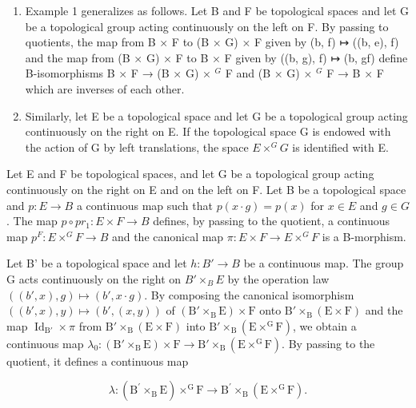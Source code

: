 \begin{enumerate}
\def\labelenumi{\arabic{enumi})}
\setcounter{enumi}{1}
\item
  Example 1 generalizes as follows. Let B and F be topological spaces and let G be a topological group acting continuously on the left on F. By passing to quotients, the map from B × F to (B × G) × F given by (b, f) ↦ ((b, e), f) and the map from (B × G) × F to B × F given by ((b, g), f) ↦ (b, gf) define B-isomorphisms B × F → (B × G) × \(^{G}\) F and (B × G) × \(^{G}\) F → B × F which are inverses of each other.
\item
  Similarly, let E be a topological space and let G be a topological group acting continuously on the right on E. If the topological space G is endowed with the action of G by left translations, the space \(E \times^{G} G\) is identified with E.
\end{enumerate}

Let E and F be topological spaces, and let G be a topological group acting continuously on the right on E and on the left on F. Let B be a topological space and \(p\colon E \to B\) a continuous map such that \(p(x \cdot g) = p(x)\) for \(x \in E\) and \(g \in G\) . The map \(p \circ pr_{1}\colon E \times F \to B\) defines, by passing to the quotient, a continuous map \(p^{F}\colon E \times^{G} F \to B\) and the canonical map \(\pi\colon E \times F \to E \times^{G} F\) is a B-morphism.

Let B' be a topological space and let \(h\colon B'\to B\) be a continuous map. The group G acts continuously on the right on \(B'\times_{B}E\) by the operation law \(((b',x),g)\mapsto(b',x\cdot g)\). By composing the canonical isomorphism \(((b',x),y)\mapsto(b',(x,y))\) of \((\mathrm{B}'\times_{\mathrm{B}}\mathrm{E})\times\mathrm{F}\) onto \(\mathrm{B}'\times_{\mathrm{B}}(\mathrm{E}\times\mathrm{F})\) and the map \(\operatorname{Id}_{\mathrm{B}'}\times\pi\) from \(\mathrm{B}'\times_{\mathrm{B}}(\mathrm{E}\times\mathrm{F})\) into \(\mathrm{B}'\times_{\mathrm{B}}(\mathrm{E}\times^{\mathrm{G}}\mathrm{F})\), we obtain a continuous map \(\lambda_{0}\colon(\mathrm{B}'\times_{\mathrm{B}}\mathrm{E})\times\mathrm{F}\to\mathrm{B}'\times_{\mathrm{B}}(\mathrm{E}\times^{\mathrm{G}}\mathrm{F})\). By passing to the quotient, it defines a continuous map

\[
\lambda \colon (\mathrm{B} ^ {\prime} \times_ {\mathrm{B}} \mathrm{E}) \times^ {\mathrm{G}} \mathrm{F} \rightarrow \mathrm{B} ^ {\prime} \times_ {\mathrm{B}} (\mathrm{E} \times^ {\mathrm{G}} \mathrm{F}).
\]

